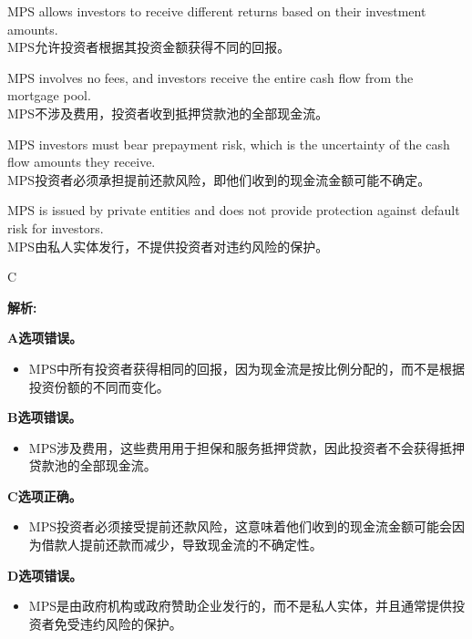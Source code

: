 \documentclass{article}
\newenvironment{explanation}
{\textbf{解析:}\par}
{\par}
\begin{document}
\begin{choices}
    \item MPS allows investors to receive different returns based on their investment amounts.\\
    MPS允许投资者根据其投资金额获得不同的回报。
    \item MPS involves no fees, and investors receive the entire cash flow from the mortgage pool.\\
    MPS不涉及费用，投资者收到抵押贷款池的全部现金流。
    \item MPS investors must bear prepayment risk, which is the uncertainty of the cash flow amounts they receive.\\
    MPS投资者必须承担提前还款风险，即他们收到的现金流金额可能不确定。
    \item MPS is issued by private entities and does not provide protection against default risk for investors.\\
    MPS由私人实体发行，不提供投资者对违约风险的保护。
\end{choices}

\begin{correctanswer}
    C
\end{correctanswer}

\begin{explanation}
    \textbf{A选项错误。}
    \begin{itemize}
        \item MPS中所有投资者获得相同的回报，因为现金流是按比例分配的，而不是根据投资份额的不同而变化。
    \end{itemize}

    \textbf{B选项错误。}
    \begin{itemize}
        \item MPS涉及费用，这些费用用于担保和服务抵押贷款，因此投资者不会获得抵押贷款池的全部现金流。
    \end{itemize}

    \textbf{C选项正确。}
    \begin{itemize}
        \item MPS投资者必须接受提前还款风险，这意味着他们收到的现金流金额可能会因为借款人提前还款而减少，导致现金流的不确定性。
    \end{itemize}

    \textbf{D选项错误。}
    \begin{itemize}
        \item MPS是由政府机构或政府赞助企业发行的，而不是私人实体，并且通常提供投资者免受违约风险的保护。
    \end{itemize}
\end{explanation}
\end{document}
